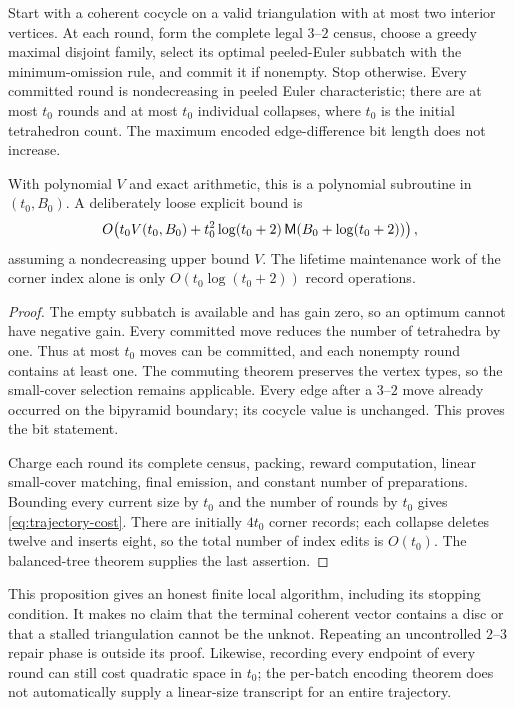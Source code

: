\begin{proposition}
\label{prop:collapse-trajectory}
Start with a coherent cocycle on a valid triangulation with at most two
interior vertices. At each round, form the complete legal $3$--$2$ census,
choose a greedy maximal disjoint family, select its optimal peeled-Euler
subbatch with the minimum-omission rule, and commit it if nonempty. Stop
otherwise. Every committed round is nondecreasing in peeled Euler
characteristic; there are at most $t_0$ rounds and at most $t_0$ individual
collapses, where $t_0$ is the initial tetrahedron count. The maximum encoded
edge-difference bit length does not increase.

With polynomial $V$ and exact arithmetic, this is a polynomial subroutine
in $(t_0,B_0)$. A deliberately loose explicit bound is
\begin{equation}\label{eq:trajectory-cost}
 O\!\left(t_0 V(t_0,B_0)+
 t_0^2\log(t_0+2)\,\mathsf M(B_0+\log(t_0+2))\right),
\end{equation}
assuming a nondecreasing upper bound $V$. The lifetime maintenance work of
the corner index alone is only
$O(t_0\log(t_0+2))$ record operations.
\end{proposition}
\begin{proof}
The empty subbatch is available and has gain zero, so an optimum cannot
have negative gain. Every committed move reduces the number of tetrahedra
by one. Thus at most $t_0$ moves can be committed, and each nonempty round
contains at least one. The commuting theorem preserves the vertex types,
so the small-cover selection remains applicable. Every edge after a
$3$--$2$ move already occurred on the bipyramid boundary; its cocycle value
is unchanged. This proves the bit statement.

Charge each round its complete census, packing, reward computation,
linear small-cover matching, final emission, and constant number of
preparations. Bounding every current size by $t_0$ and the number of rounds
by $t_0$ gives \eqref{eq:trajectory-cost}. There are initially $4t_0$ corner
records; each collapse deletes twelve and inserts eight, so the total
number of index edits is $O(t_0)$. The balanced-tree theorem supplies the
last assertion.
\end{proof}

This proposition gives an honest finite local algorithm, including its
stopping condition. It makes no claim that the terminal coherent vector
contains a disc or that a stalled triangulation cannot be the unknot.
Repeating an uncontrolled $2$--$3$ repair phase is outside its proof.
Likewise, recording every endpoint of every round can still cost quadratic
space in $t_0$; the per-batch encoding theorem does not automatically supply
a linear-size transcript for an entire trajectory.

